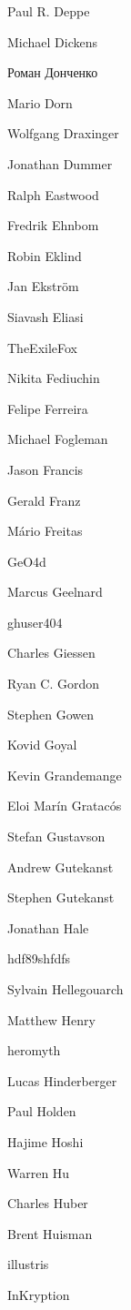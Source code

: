 \begin{DoxyItemize}
\item Paul R. Deppe
\item Michael Dickens
\item Роман Донченко
\item Mario Dorn
\item Wolfgang Draxinger
\item Jonathan Dummer
\item Ralph Eastwood
\item Fredrik Ehnbom
\item Robin Eklind
\item Jan Ekström
\item Siavash Eliasi
\item The\+Exile\+Fox
\item Nikita Fediuchin
\item Felipe Ferreira
\item Michael Fogleman
\item Jason Francis
\item Gerald Franz
\item Mário Freitas
\item Ge\+O4d
\item Marcus Geelnard
\item ghuser404
\item Charles Giessen
\item Ryan C. Gordon
\item Stephen Gowen
\item Kovid Goyal
\item Kevin Grandemange
\item Eloi Marín Gratacós
\item Stefan Gustavson
\item Andrew Gutekanst
\item Stephen Gutekanst
\item Jonathan Hale
\item hdf89shfdfs
\item Sylvain Hellegouarch
\item Matthew Henry
\item heromyth
\item Lucas Hinderberger
\item Paul Holden
\item Hajime Hoshi
\item Warren Hu
\item Charles Huber
\item Brent Huisman
\item illustris
\item In\+Kryption

\end{DoxyItemize}

